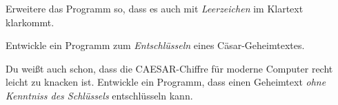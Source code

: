 \documentclass[11pt, a4paper, ngerman]{arbeitsblatt}
\begin{document}
\begin{aufgabe}
	\label{aufg:decode}
	\begin{enuma}
		\item Erweitere das Programm so, dass es auch mit \emph{Leerzeichen} im Klartext klarkommt.
		\item Entwickle ein Programm zum \emph{Entschlüsseln} eines Cäsar-Geheimtextes.
	\end{enuma}
\end{aufgabe}

\begin{aufgabe}
	\label{aufg:break}
	Du weißt auch schon, dass die CAESAR-Chiffre für moderne Computer recht leicht zu knacken
	ist. Entwickle ein Programm, dass einen Geheimtext \emph{ohne Kenntniss des Schlüssels}
	entschlüsseln kann.


\end{aufgabe}
\end{document}
